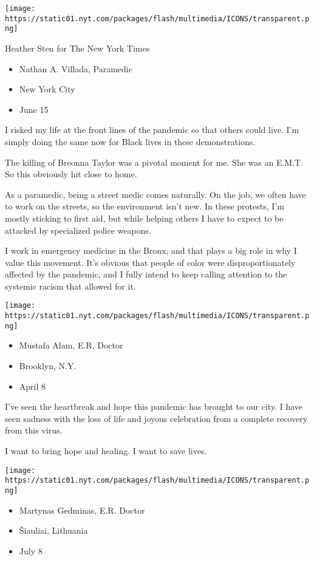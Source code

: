 \texttt{[image: https://static01.nyt.com/packages/flash/multimedia/ICONS/transparent.png]}

Heather Sten for The New York Times

\begin{itemize}
\tightlist
\item
  Nathan A. Villada, Paramedic
\item
  New York City
\item
  June 15
\end{itemize}

I risked my life at the front lines of the pandemic so that others could
live. I'm simply doing the same now for Black lives in these
demonstrations.

The killing of Breonna Taylor was a pivotal moment for me. She was an
E.M.T. So this obviously hit close to home.

As a paramedic, being a street medic comes naturally. On the job, we
often have to work on the streets, so the environment isn't new. In
these protests, I'm mostly sticking to first aid, but while helping
others I have to expect to be attacked by specialized police weapons.

I work in emergency medicine in the Bronx, and that plays a big role in
why I value this movement. It's obvious that people of color were
disproportionately affected by the pandemic, and I fully intend to keep
calling attention to the systemic racism that allowed for it.

\texttt{[image: https://static01.nyt.com/packages/flash/multimedia/ICONS/transparent.png]}

\begin{itemize}
\tightlist
\item
  Mustafa Alam, E.R. Doctor
\item
  Brooklyn, N.Y.
\item
  April 8
\end{itemize}

I've seen the heartbreak and hope this pandemic has brought to our city.
I have seen sadness with the loss of life and joyous celebration from a
complete recovery from this virus.

I want to bring hope and healing. I want to save lives.

\texttt{[image: https://static01.nyt.com/packages/flash/multimedia/ICONS/transparent.png]}

\begin{itemize}
\tightlist
\item
  Martynas Gedminas, E.R. Doctor
\item
  Šiauliai, Lithuania
\item
  July 8
\end{itemize}

